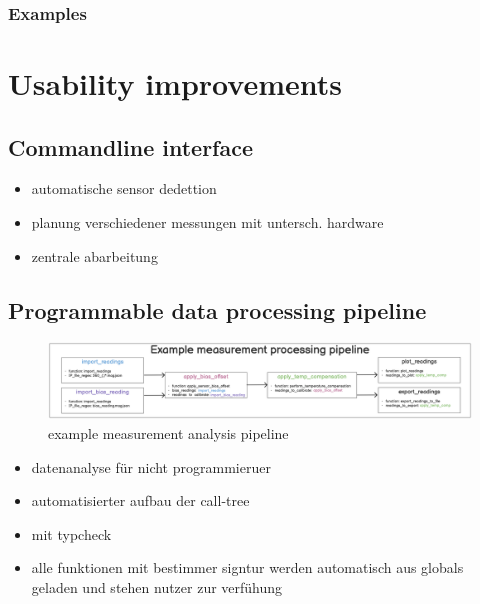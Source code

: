\hypertarget{examples}{%
\subsection{Examples}\label{examples}}

\hypertarget{usability-improvements}{%
\chapter{Usability improvements}\label{usability-improvements}}

\hypertarget{commandline-interface}{%
\section{Commandline interface}\label{commandline-interface}}

\begin{itemize}
\tightlist
\item
  automatische sensor dedettion
\item
  planung verschiedener messungen mit untersch. hardware
\item
  zentrale abarbeitung
\end{itemize}

\hypertarget{programmable-data-processing-pipeline}{%
\section{Programmable data processing
pipeline}\label{programmable-data-processing-pipeline}}

\begin{figure}
\centering
\includegraphics{./generated_images/border_example_measurement_analysis_pipeline.png}
\caption{example measurement analysis pipeline
\label{example_measurement_analysis_pipeline.png}}
\end{figure}

\begin{itemize}
\tightlist
\item
  datenanalyse für nicht programmieruer
\item
  automatisierter aufbau der call-tree
\item
  mit typcheck
\item
  alle funktionen mit bestimmer signtur werden automatisch aus globals
  geladen und stehen nutzer zur verfühung
\end{itemize}

